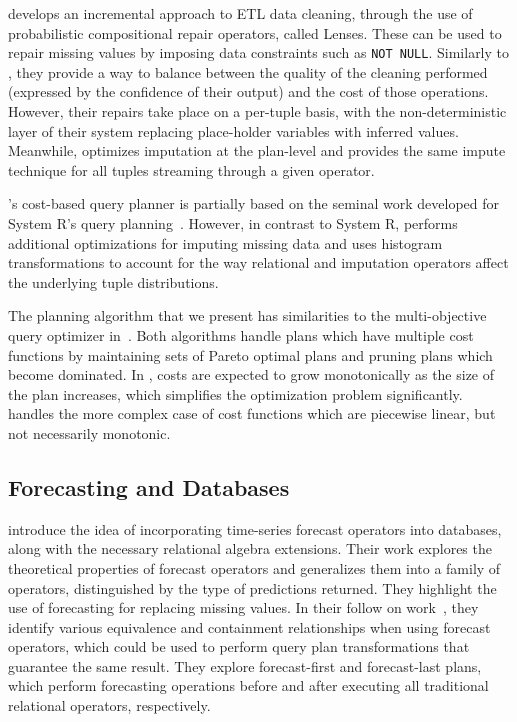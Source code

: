 \cite{yang2015lenses} develops an incremental approach to ETL data cleaning, through the use
of probabilistic compositional repair operators, called Lenses. These can be used
to repair missing values by imposing data constraints such as \verb|NOT NULL|. 
Similarly to \ProjectName{}, they provide a way to balance between the quality of the cleaning 
performed (expressed by the confidence of their output) and the cost of those operations. However, their 
repairs take place on a per-tuple basis, with the non-deterministic layer of their system replacing place-holder
variables with inferred values. Meanwhile, \ProjectName{} optimizes imputation at the plan-level and
provides the same impute technique for all tuples streaming through a given operator.

\ProjectName's cost-based query planner 
is partially based on the seminal work developed for System R's query planning~\cite{blasgen1981system}.
However, in contrast to System R, \ProjectName{} performs additional optimizations for imputing missing data and
uses histogram transformations to account for the way relational and imputation operators affect the underlying
tuple distributions.

The planning algorithm that we present has similarities to the multi-objective query optimizer in~\cite{trummer2014}.
Both algorithms handle plans which have multiple cost functions by maintaining sets of Pareto optimal plans and pruning plans which become dominated.
In \ProjectName{}, costs are expected to grow monotonically as the size of the plan increases, which simplifies the optimization problem significantly.
\cite{trummer2014} handles the more complex case of cost functions which are piecewise linear, but not necessarily monotonic.

\subsection{Forecasting and Databases}
\cite{parisi2011embedding} introduce the idea of incorporating time-series forecast operators into
databases, along with the necessary relational algebra extensions. Their work explores the theoretical
properties of forecast operators and generalizes them into a family of operators, distinguished by
the type of predictions returned. They highlight the use of forecasting for replacing missing values.
In their follow on work~\cite{parisi2013temporal}, they identify various equivalence and containment
relationships when using forecast operators, which could be used to perform query plan transformations that guarantee the same result. They
explore forecast-first and forecast-last plans, which perform forecasting operations before and after executing all traditional
relational operators, respectively. 

